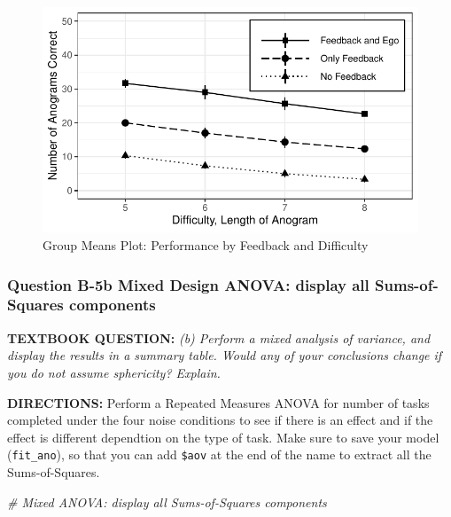 \documentclass[
]{article}
\newenvironment{Shaded}{\begin{snugshade}}{\end{snugshade}}
\newcommand{\CommentTok}[1]{\textcolor[rgb]{0.56,0.35,0.01}{\textit{#1}}}
\begin{document}
\begin{figure}

{\centering \includegraphics{Chapter-16-Assignment-R-Skeleton--2020spring-_files/figure-latex/unnamed-chunk-13-1} 

}

\caption{Group Means Plot: Performance by Feedback and Difficulty}\label{fig:unnamed-chunk-13}
\end{figure}

\clearpage

\hypertarget{question-b-5b-mixed-design-anova-display-all-sums-of-squares-components}{%
\subsubsection{Question B-5b Mixed Design ANOVA: display all
Sums-of-Squares
components}\label{question-b-5b-mixed-design-anova-display-all-sums-of-squares-components}}

\textbf{TEXTBOOK QUESTION:} \emph{(b) Perform a mixed analysis of
variance, and display the results in a summary table. Would any of your
conclusions change if you do not assume sphericity? Explain.}

\textbf{DIRECTIONS:} Perform a Repeated Measures ANOVA for number of
tasks completed under the four noise conditions to see if there is an
effect and if the effect is different dependtion on the type of task.
Make sure to save your model (\texttt{fit\_ano}), so that you can add
\texttt{\$aov} at the end of the name to extract all the
Sums-of-Squares.

\begin{Shaded}
\begin{Highlighting}[]
\CommentTok{\# Mixed ANOVA: display all Sums{-}of{-}Squares components}
\end{Highlighting}
\end{Shaded}
\end{document}
